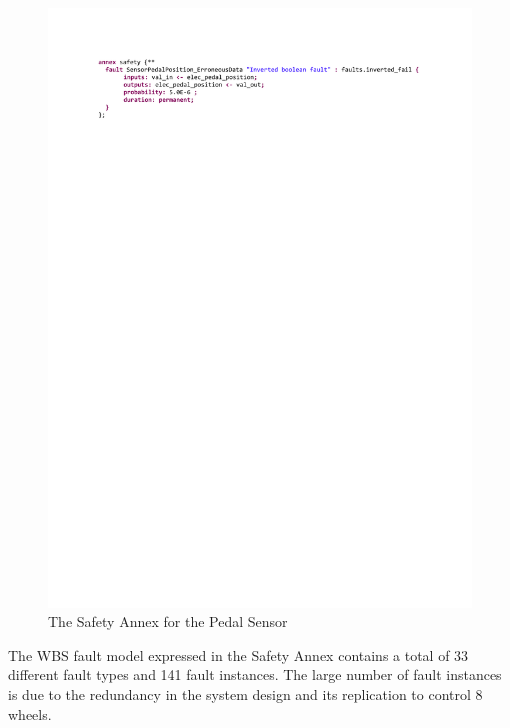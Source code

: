 \begin{figure}[h!]
	\hspace*{-2cm}
	\begin{center}
		\includegraphics[trim=0 680 -10 70,clip,width=1.5\dimexpr\textwidth-2cm\relax]{images/safetyannex_sensorfault.pdf}
		\vspace{-0.2in}
		\caption{The Safety Annex for the Pedal Sensor}
		\label{fig:sensorFault}
	\end{center}
	\vspace{-0.2in}
\end{figure}

The WBS fault model expressed in the Safety Annex contains a total of 33 different fault types and 141 fault instances. The large number of fault instances is due to the redundancy in the system design and its replication to control 8 wheels.

